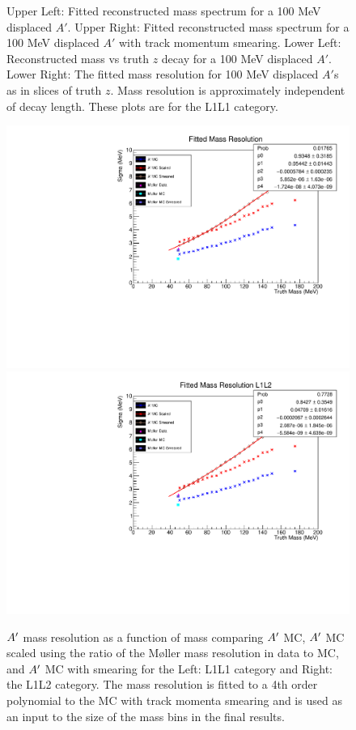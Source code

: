 \begin{figure}[!hb]
    \caption{Upper Left: Fitted reconstructed mass spectrum for a 100 MeV displaced $A'$. Upper Right: Fitted reconstructed mass spectrum for a 100 MeV displaced $A'$ with track momentum smearing. Lower Left: Reconstructed mass vs truth $z$ decay for a 100 MeV displaced $A'$. Lower Right: The fitted mass resolution for 100 MeV displaced $A'$s as in slices of truth $z$. Mass resolution is approximately  independent of decay length. These plots are for the L1L1 category.
    }
    \label{fig:mass_resolution_L1L1}
\end{figure}


\begin{figure}[!hb]
    \centering
    \includegraphics[width=.45\textwidth]{figs/selection/massResL1L1.pdf}
    \includegraphics[width=.45\textwidth]{figs/Results/massRes_L1L2.pdf}
    \caption{$A^\prime$ mass resolution as a function of mass comparing $A^\prime$ MC, $A^\prime$ MC scaled using the ratio of the M\o ller mass resolution in data to MC, and $A^\prime$ MC with smearing for the Left: L1L1 category and Right: the L1L2 category. The mass resolution is fitted to a 4th order polynomial to the MC with track momenta smearing and is used as an input to the size of the mass bins in the final results.
    }
    \label{fig:mass_resolution}
\end{figure}

